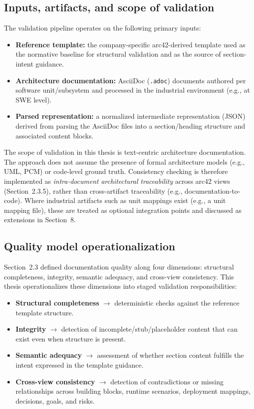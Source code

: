 \subsection{Inputs, artifacts, and scope of validation}
The validation pipeline operates on the following primary inputs:
\begin{itemize}
    \item \textbf{Reference template:} the company-specific arc42-derived template used as the normative baseline for structural validation and as the source of section-intent guidance.
    \item \textbf{Architecture documentation:} AsciiDoc (\texttt{.adoc}) documents authored per software unit/subsystem and processed in the industrial environment (e.g., at SWE level).
    \item \textbf{Parsed representation:} a normalized intermediate representation (JSON) derived from parsing the AsciiDoc files into a section/heading structure and associated content blocks.
\end{itemize}

The scope of validation in this thesis is text-centric architecture documentation. The approach does not assume the presence of formal architecture models (e.g., UML, PCM) or code-level ground truth. Consistency checking is therefore implemented as \emph{intra-document architectural traceability} across arc42 views (Section~2.3.5), rather than cross-artifact traceability (e.g., documentation-to-code). Where industrial artifacts such as unit mappings exist (e.g., a unit mapping file), these are treated as optional integration points and discussed as extensions in Section~8.

\subsection{Quality model operationalization}
Section~2.3 defined documentation quality along four dimensions: structural completeness, integrity, semantic adequacy, and cross-view consistency. This thesis operationalizes these dimensions into staged validation responsibilities:
\begin{itemize}
    \item \textbf{Structural completeness} $\rightarrow$ deterministic checks against the reference template structure.
    \item \textbf{Integrity} $\rightarrow$ detection of incomplete/stub/placeholder content that can exist even when structure is present.
    \item \textbf{Semantic adequacy} $\rightarrow$ assessment of whether section content fulfills the intent expressed in the template guidance.
    \item \textbf{Cross-view consistency} $\rightarrow$ detection of contradictions or missing relationships across building blocks, runtime scenarios, deployment mappings, decisions, goals, and risks.
\end{itemize}

